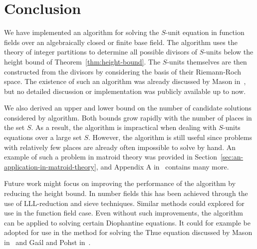 
\chapter{Conclusion}%
\label{chap:conclusion}

We have implemented an algorithm for solving the \(S\)-unit equation in function fields over an algebraically closed or finite base field. The algorithm uses the theory of integer partitions to determine all possible divisors of \(S\)-units below the height bound of Theorem~\ref{thm:height-bound}. The \(S\)-units themselves are then constructed from the divisors by considering the basis of their Riemann-Roch space. The existence of such an algorithm was already discussed by Mason in~\cite{mason-1984-diophantine-equations-over}, but no detailed discussion or implementation was publicly available up to now.

We also derived an upper and lower bound on the number of candidate solutions considered by algorithm. Both bounds grow rapidly with the number of places in the set \(S\). As a result, the algorithm is impractical when dealing with \(S\)-units equations over a large set \(S\). However, the algorithm is still useful since problems with relatively few places are already often impossible to solve by hand. An example of such a problem in matroid theory was provided in Section~\ref{sec:an-application-in-matroid-theory}, and Appendix A in~\cite{baker-2024-foundations-of-matroids} contains many more.

Future work might focus on improving the performance of the algorithm by reducing the height bound. In number fields this has been achieved through the use of LLL-reduction and sieve techniques. Similar methods could explored for use in the function field case. Even without such improvements, the algorithm can be applied to solving certain Diophantine equations. It could for example be adopted for use in the method for solving the Thue equation discussed by Mason in~\cite{mason-1984-diophantine-equations-over} and Ga\'{a}l and Pohst in~\cite{gaal-2006-diophantine-equations-over, gaal-2006-diophantine-equations-overa}.
